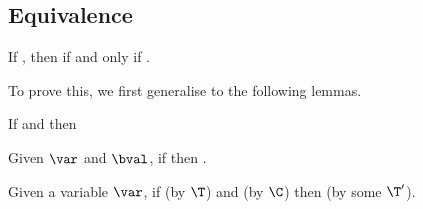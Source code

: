 \subsection*{Equivalence}

\begin{theorem} 
\label{thm:equivalence-hb} If \trahb{\hbctx}{\envnil}{\bexp}{\hexp}, then  if and only if .
\end{theorem}

To prove this, we first generalise to the following lemmas.

\begin{lemma}
\label{lem:substitution-cor}
If \corhb{\hbxtx}{\bval}{\hexp} and  then 
\end{lemma}

\begin{lemma}
\label{lem:substitution-lookup}
Given $\var$ and $\bval$, if  then .
\end{lemma}

\begin{lemma}
\label{lem:substitution-trans}
Given a variable $\var$, if \trahb{\hbctx}{\benv}{\bexp}{\hexp} (by $\T$) and \corhb{\hbctx}{\bval}{\hval} (by $\C$) then \trahb{\hbctx}{\sub{\benv}{\bval}{\var}}{\bexp}{\sub{\hexp}{\hval}{\var}} (by some $\T'$).
\end{lemma}


